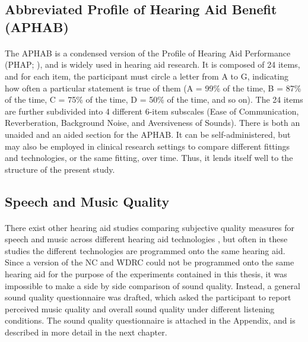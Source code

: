 \subsection{Abbreviated Profile of Hearing Aid Benefit (APHAB)}
\paragraph{}The APHAB \cite{Cox1995} is a condensed version of the Profile of Hearing Aid Performance (PHAP; ), and is widely used in hearing aid research.  It is composed of 24 items, and for each item, the participant must circle a letter from A to G, indicating how often a particular statement is true of them (A = 99\% of the time, B = 87\% of the time, C = 75\% of the time, D = 50\% of the time, and so on).  The 24 items are further subdivided into 4 different 6-item subscales (Ease of Communication, Reverberation, Background Noise, and Aversiveness of Sounds).  There is both an unaided and an aided section for the APHAB.  It can be self-administered, but may also be employed in clinical research settings to compare different fittings and technologies, or the same fitting, over time.  Thus, it lends itself well to the structure of the present study.

\subsection{Speech and Music Quality}
\paragraph{}There exist other hearing aid studies comparing subjective quality measures for speech and music across different hearing aid technologies \cite{Boike2000, Larson2000, Davies-Venn2007}, but often in these studies the different technologies are programmed onto the same hearing aid.  Since a version of the NC and WDRC could not be programmed onto the same hearing aid for the purpose of the experiments contained in this thesis, it was impossible to make a side by side comparison of sound quality.  Instead, a general sound quality questionnaire was drafted, which asked the participant to report perceived music quality and overall sound quality under different listening conditions.  The sound quality questionnaire is attached in the Appendix, and is described in more detail in the next chapter. 